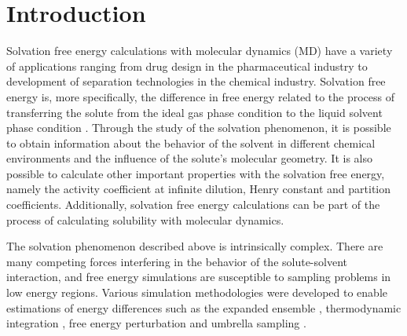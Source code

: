 \chapter{Introduction} %
\label{Chapter1} %
\pagestyle{simple}
\doublespacing
Solvation free energy calculations with molecular dynamics (MD) have a variety of applications ranging from drug design in the pharmaceutical industry to development of separation technologies in the chemical industry. {Solvation free energy is, more specifically, the difference in free energy related to the process of transferring the solute from the ideal gas phase condition to the liquid solvent phase condition \cite{shirts2013}} . Through the study of the solvation phenomenon, it is possible to obtain information about the behavior of the solvent in different chemical environments and the influence of the solute's molecular geometry. It is also possible to calculate other important properties with the solvation free energy, namely the activity coefficient at infinite dilution, Henry constant and partition coefficients.{ Additionally, solvation free energy calculations can be part of the process of calculating solubility with molecular dynamics}. 

The solvation phenomenon described above is intrinsically complex. There are many competing forces interfering in the behavior of the solute-solvent interaction, and free energy simulations are susceptible to sampling problems in low energy regions. {Various simulation methodologies were developed to enable estimations of energy differences} such as the expanded ensemble \cite{lyubartsev}, thermodynamic integration \cite{kirkwood1935}, free energy perturbation \cite{zwanzig1954,bennet1976,mbar} and umbrella sampling \cite{TORRIE1977187}. 

